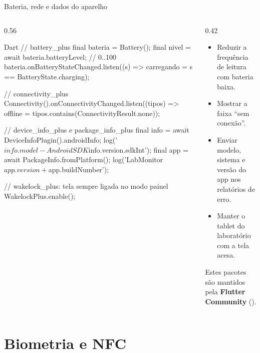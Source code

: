 \documentclass[aspectratio=169,10pt]{beamer}
\begin{document}
\begin{frame}[fragile]{Bateria, rede e dados do aparelho}
  \begin{columns}[T]
    \begin{column}{0.56\textwidth}
\begin{codigo}[title=Pacotes ``plus'' da comunidade]{Dart}
// battery_plus
final bateria = Battery();
final nivel = await bateria.batteryLevel;          // 0..100
bateria.onBatteryStateChanged.listen((s) =>
    carregando = s == BatteryState.charging);

// connectivity_plus
Connectivity().onConnectivityChanged.listen((tipos) =>
    offline = tipos.contains(ConnectivityResult.none));

// device_info_plus e package_info_plus
final info = await DeviceInfoPlugin().androidInfo;
log('${info.model} - Android SDK ${info.version.sdkInt}');
final app = await PackageInfo.fromPlatform();
log('LabMonitor ${app.version}+${app.buildNumber}');

// wakelock_plus: tela sempre ligada no modo painel
WakelockPlus.enable();
\end{codigo}
    \end{column}
    \begin{column}{0.42\textwidth}
      \begin{conceito}
        \begin{itemize}
          \item Reduzir a frequência de leitura com bateria baixa.
          \item Mostrar a faixa ``sem conexão''.
          \item Enviar modelo, sistema e versão do app nos relatórios de erro.
          \item Manter o tablet do laboratório com a tela acesa.
        \end{itemize}
      \end{conceito}
      \begin{dica}
        Estes pacotes são mantidos pela \textbf{Flutter Community} ().
      \end{dica}
    \end{column}
  \end{columns}
\end{frame}

\section{Biometria e NFC}
\end{document}
